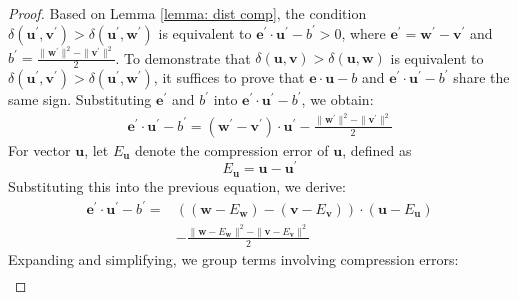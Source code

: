 \begin{proof}
    Based on Lemma \ref{lemma: dist comp}, the condition $\delta(\boldsymbol{u}^{\prime}, \boldsymbol{v}^{\prime}) > \delta(\boldsymbol{u}^{\prime}, \boldsymbol{w}^{\prime})$ is equivalent to $\boldsymbol{e}^{\prime} \cdot \boldsymbol{u}^{\prime} - b^{\prime} > 0$, where $\boldsymbol{e}^{\prime}=\boldsymbol{w}^{\prime}-\boldsymbol{v}^{\prime}$ and $b^{\prime}=\frac{\|\boldsymbol{w}^{\prime}\|^2 - \|\boldsymbol{v}^{\prime}\|^2}{2}$. To demonstrate that $\delta(\boldsymbol{u}, \boldsymbol{v}) > \delta(\boldsymbol{u}, \boldsymbol{w})$ is equivalent to $\delta(\boldsymbol{u}^{\prime}, \boldsymbol{v}^{\prime}) > \delta(\boldsymbol{u}^{\prime}, \boldsymbol{w}^{\prime})$, it suffices to prove that $\boldsymbol{e} \cdot \boldsymbol{u} - b$ and $\boldsymbol{e}^{\prime} \cdot \boldsymbol{u}^{\prime} - b^{\prime}$ share the same sign.
Substituting $\boldsymbol{e}^{\prime}$ and $b^{\prime}$ into $\boldsymbol{e}^{\prime} \cdot \boldsymbol{u}^{\prime} - b^{\prime}$, we obtain:
\begin{equation}
\begin{aligned}
    \boldsymbol{e}^{\prime} \cdot \boldsymbol{u}^{\prime} - b^{\prime} = (\boldsymbol{w}^{\prime}-\boldsymbol{v}^{\prime}) \cdot \boldsymbol{u}^{\prime} - \frac{\|\boldsymbol{w}^{\prime}\|^2 - \|\boldsymbol{v}^{\prime}\|^2}{2}
\end{aligned}
\end{equation}
For vector $\boldsymbol{u}$, let $E_{\boldsymbol{u}}$ denote the compression error of $\boldsymbol{u}$, defined as
\begin{equation}
\label{equ: error}
    E_{\boldsymbol{u}} = \boldsymbol{u} - \boldsymbol{u}^{\prime}
\end{equation}
Substituting this into the previous equation, we derive:
\begin{equation}
\label{equ: error1}
\begin{aligned}
    \boldsymbol{e}^{\prime} \cdot \boldsymbol{u}^{\prime} - b^{\prime}
    = &((\boldsymbol{w}-E_{\boldsymbol{w}})-(\boldsymbol{v}-E_{\boldsymbol{v}})) \cdot (\boldsymbol{u}-E_{\boldsymbol{u}}) \\
    &- \frac{\|\boldsymbol{w}-E_{\boldsymbol{w}}\|^2 - \|\boldsymbol{v}-E_{\boldsymbol{v}}\|^2}{2}
\end{aligned}
\end{equation}
Expanding and simplifying, we group terms involving compression errors:
\begin{equation}
\begin{aligned}

\end{aligned}
\end{equation}
\end{proof}

